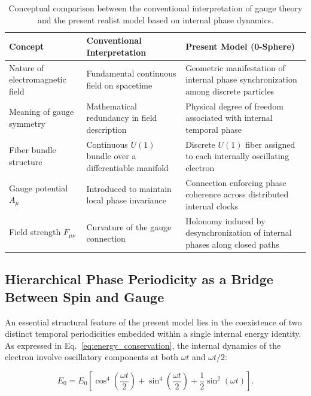 \documentclass[%
 reprint,
 amsmath,amssymb,
 aps,
]{revtex4-1}
\numberwithin{equation}{section}%
\begin{document}
\begin{table}[t!]
\renewcommand{\arraystretch}{1.5} %
\centering
\caption{Conceptual comparison between the conventional interpretation of gauge theory and the present realist model based on internal phase dynamics.}
\begin{tabular}{|p{4.5cm}|p{5.6cm}|p{6.6cm}|}
\hline
\textbf{Concept} & \textbf{Conventional Interpretation} & \textbf{Present Model (0-Sphere)} \\
\hline
Nature of electromagnetic field & Fundamental continuous field on spacetime & Geometric manifestation of internal phase synchronization among discrete particles \\
\hline
Meaning of gauge symmetry & Mathematical redundancy in field description & Physical degree of freedom associated with internal temporal phase \\
\hline
Fiber bundle structure & Continuous $U(1)$ bundle over a differentiable manifold & Discrete $U(1)$ fiber assigned to each internally oscillating electron \\
\hline
Gauge potential $A_\mu$ & Introduced to maintain local phase invariance & Connection enforcing phase coherence across distributed internal clocks \\
\hline
Field strength $F_{\mu\nu}$ & Curvature of the gauge connection & Holonomy induced by desynchronization of internal phases along closed paths \\
\hline
\end{tabular}
\label{tab:conceptual_comparison}
\end{table}



\subsection{Hierarchical Phase Periodicity as a Bridge Between Spin and Gauge}

An essential structural feature of the present model lies in the coexistence of two distinct temporal periodicities embedded within a single internal energy identity. As expressed in Eq.~\eqref{eq:energy_conservation}, the internal dynamics of the electron involve oscillatory components at both $\omega t$ and $\omega t/2$:

\begin{equation}
E_0 = E_0\left[\cos^4\left(\frac{\omega t}{2}\right) + \sin^4\left(\frac{\omega t}{2}\right) + \frac{1}{2}\sin^2(\omega t)\right].
\label{eq:energy_conservation}
\end{equation}
\end{document}
